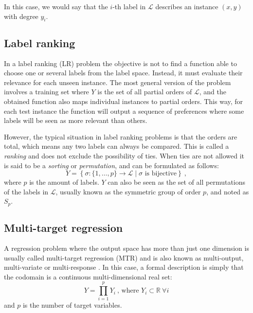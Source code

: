 In this case, we would say that the $i$-th label in $\mathcal L$ describes an instance $(x, y)$ with degree $y_i$.

\subsection{Label ranking}

In a label ranking (LR) problem  the objective is not to find a function able to choose one or several labels from the label space. Instead, it must evaluate their relevance for each unseen instance. The most general version of the problem involves a training set where $Y$ is the set of all partial orders of $\mathcal L$, and the obtained function also maps individual instances to partial orders. This way, for each test instance the function will output a sequence of preferences where some labels will be seen as more relevant than others. 

However, the typical situation in label ranking problems is that the orders are total, which means any two labels can always be compared. This is called a \emph{ranking} and does not exclude the possibility of ties. When ties are not allowed it is said to be a \emph{sorting} or \emph{permutation}, and can be formulated as follows:
\begin{equation}
Y=\left\{\sigma:\{1,\dots,p\}\rightarrow \mathcal L\mid\sigma\mbox{ is bijective}\right\}~,
\end{equation}
where $p$ is the amount of labels. $Y$ can also be seen as the set of all permutations of the labels in $\mathcal L$, usually known as the symmetric group of order $p$, and noted as $S_p$. 

\subsection{Multi-target regression}
\label{p3sec:mtarget}

A regression problem where the output space has more than just one dimension is usually called multi-target regression (MTR) and is also known as multi-output, multi-variate or multi-response . In this case, a formal description is simply that the codomain is a continuous multi-dimensional real set:
\begin{equation}
  Y=\prod_{i=1}^p Y_i~\mbox{, where }Y_i\subset\mathbb R~\forall i
  \end{equation}
and $p$ is the number of target variables.
 
